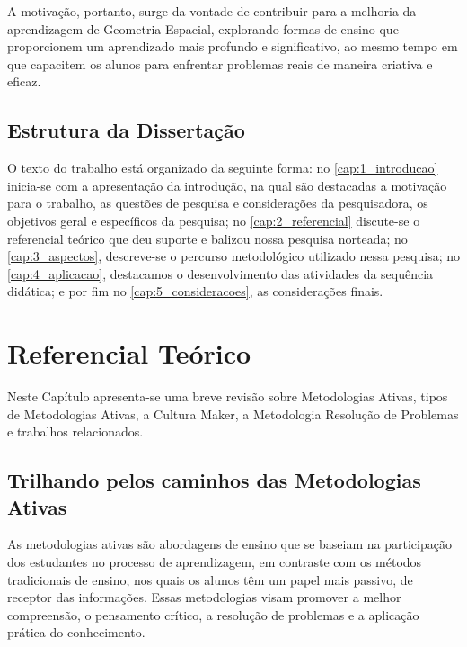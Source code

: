 A motivação, portanto, surge da vontade de contribuir para a melhoria da aprendizagem de Geometria Espacial, explorando formas de ensino que proporcionem um aprendizado mais profundo e significativo, ao mesmo tempo em que capacitem os alunos para enfrentar problemas reais de maneira criativa e eficaz.

\section{Estrutura da Dissertação}

O texto do trabalho está organizado da seguinte forma: no \autoref{cap:1_introducao} inicia-se com a apresentação da introdução, na qual são destacadas a motivação para o trabalho, as questões de pesquisa e considerações da pesquisadora, os objetivos geral e específicos da pesquisa; no \autoref{cap:2_referencial} discute-se o referencial teórico que deu suporte e balizou nossa pesquisa norteada; no \autoref{cap:3_aspectos}, descreve-se o percurso metodológico utilizado nessa pesquisa; no \autoref{cap:4_aplicacao}, destacamos o desenvolvimento das atividades da sequência didática; e por fim no \autoref{cap:5_consideracoes}, as considerações finais.



\chapter{Referencial Teórico} \label{cap:2_referencial}

Neste Capítulo apresenta-se uma breve revisão sobre Metodologias Ativas, tipos de Metodologias Ativas, a Cultura Maker, a Metodologia Resolução de Problemas e trabalhos relacionados.

\section{Trilhando pelos caminhos das Metodologias Ativas}

As metodologias ativas são abordagens de ensino que se baseiam na participação dos estudantes no processo de aprendizagem, em contraste com os métodos tradicionais de ensino, nos quais os alunos têm um papel mais passivo, de receptor das informações. Essas metodologias visam promover a melhor compreensão, o pensamento crítico, a resolução de problemas e a aplicação prática do conhecimento.

